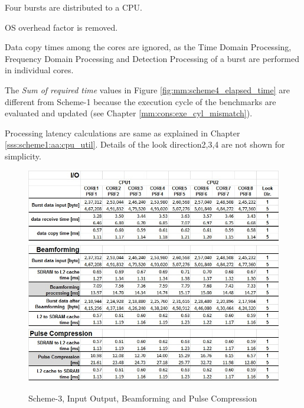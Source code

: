 \begin{compactitem}
	\item Four bursts are distributed to a CPU.
	\item OS overhead factor is removed.
	\item Data copy times among the cores are ignored, as the Time Domain Processing, Frequency Domain Processing and Detection Processing of a burst are performed in individual cores.
	\item The \textsl{Sum of required time} values in Figure \ref{fig:mm:scheme4_elapsed_time} are different from Scheme-1 because the execution cycle of the benchmarks are evaluated and updated (see Chapter \ref{mm:cons:exe_cyl_mismatch}).
\end{compactitem}
\vspace*{0.2cm}
Processing latency calculations are same as explained in Chapter \ref{sss:scheme1:aa:cpu_util}. Details of the look direction2,3,4 are not shown for simplicity.
\begin{figure}[h!]
	\centering
	\includegraphics[width=140mm]{figures/scheme4_io}
	\includegraphics[width=140mm]{figures/scheme4_bf}
	\includegraphics[width=140mm]{figures/scheme4_pc}
	\caption{Scheme-3, Input Output, Beamforming and Pulse Compression}
	\label{fig:mm:scheme4_io}
\end{figure}

